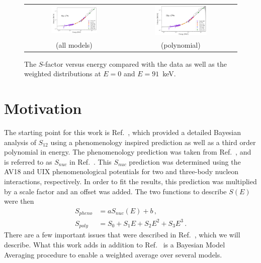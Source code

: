 \documentclass[prd,10pt,superscriptaddress,notitlepage,tightenlines,nofootinbib,floatfix]{revtex4-1}
\begin{document}
\begin{figure}
\begin{tabular}{cc}
\includegraphics[width=0.49\textwidth]{figures/S_model_avg_all}
&
\includegraphics[width=0.49\textwidth]{figures/S_model_avg_poly}
\\
(all models) & (polynomial)
\end{tabular}
\caption{\label{fig:S_factor_E}
The $S$-factor versus energy compared with the data as well as the weighted distributions at $E=0$ and $E=91$~keV.}
\end{figure}
    



\section{Motivation}

The starting point for this work is Ref.~\cite{Moscoso:2021xog}, which provided a detailed Bayesian analysis of $S_{12}$ using a phenomenology inspired prediction as well as a third order polynomial in energy.
The phenomenology prediction was taken from Ref.~\cite{Marcucci:2005zc}, 
and is referred to as $S_{nuc}$ in Ref.~\cite{Moscoso:2021xog}. 
This $S_{nuc}$ prediction was determined using the AV18 and UIX phenomenological potentials for two and three-body nucleon interactions, respectively.
In order to fit the results, this prediction was multiplied by a scale factor and an offset was added.
The two functions to describe $S(E)$ were then
\begin{align}
S_{pheno} &= a S_{nuc}(E) + b\, ,
\nonumber\\
S_{poly} &= S_0 + S_1 E + S_2 E^2 + S_3 E^3\, .
\end{align}
There are a few important issues that were described in Ref.~\cite{Moscoso:2021xog}, which we will describe.
What this work adds in addition to Ref.~\cite{Moscoso:2021xog} is a Bayesian Model Averaging procedure to enable a weighted average over several models.
\end{document}
